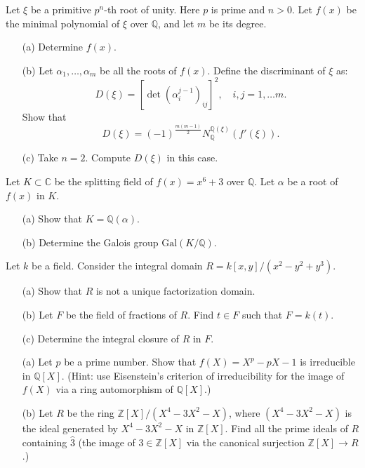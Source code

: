 \begin{prob}[S2005-Q3]
    Let \(\xi\) be a primitive \(p^n\)-th root of unity. Here \(p\) is prime and \(n > 0\). Let \(f(x)\) be the minimal polynomial of \(\xi\) over \(\mathbb{Q}\), and let \(m\) be its degree.
    \begin{itemize}
        \item[(a)] Determine \(f(x)\).
        \item[(b)] Let \(\alpha_1, \ldots, \alpha_m\) be all the roots of \(f(x)\). Define the discriminant of \(\xi\) as:
        \[D(\xi) = [\det(\alpha_i^{j-1})_{ij}]^2, \quad i, j = 1, \ldots m.\]
        Show that
        \[D(\xi) = (-1)^{\frac{m(m-1)}{2}} N_{\mathbb{Q}}^{\mathbb{Q}(\xi)}(f'(\xi)).\]
        \item[(c)] Take \(n = 2\). Compute \(D(\xi)\) in this case.
    \end{itemize}
\end{prob}


\begin{prob}[S2004-Q2]
    Let \(K \subset \mathbb{C}\) be the splitting field of \(f(x) = x^6 + 3\) over \(\mathbb{Q}\). Let \(\alpha\) be a root of \(f(x)\) in \(K\).
    \begin{itemize}
        \item[(a)] Show that \(K = \mathbb{Q}(\alpha)\).
        \item[(b)] Determine the Galois group \(\text{Gal}(K/\mathbb{Q})\).
    \end{itemize}
\end{prob}

\begin{prob}[S2004-Q4]
    Let \(k\) be a field. Consider the integral domain \(R = k[x,y]/(x^2 - y^2 + y^3)\).
    \begin{itemize}
        \item[(a)] Show that \(R\) is not a unique factorization domain.
        \item[(b)] Let \(F\) be the field of fractions of \(R\). Find \(t \in F\) such that \(F = k(t)\).
        \item[(c)] Determine the integral closure of \(R\) in \(F\).
    \end{itemize}
\end{prob}

\begin{prob}[F2000-Q2]
    \phantom{text}
    \begin{itemize}
        \item[(a)] Let \(p\) be a prime number. Show that \(f(X)=X^p-pX-1\) is irreducible in \(\mathbb{Q}[X]\). (Hint: use Eisenstein's criterion of irreducibility for the image of \(f(X)\) via a ring automorphism of \(\mathbb{Q}[X]\).)
        \item[(b)] Let \(R\) be the ring \(\mathbb{Z}[X]/(X^4-3X^2-X)\), where \((X^4-3X^2-X)\) is the ideal generated by \(X^4-3X^2-X\) in \(\mathbb{Z}[X]\). Find all the prime ideals of \(R\) containing \(\hat{3}\) (the image of \(3 \in \mathbb{Z}[X]\) via the canonical surjection \(\mathbb{Z}[X] \to R\).)
    \end{itemize}
\end{prob}

